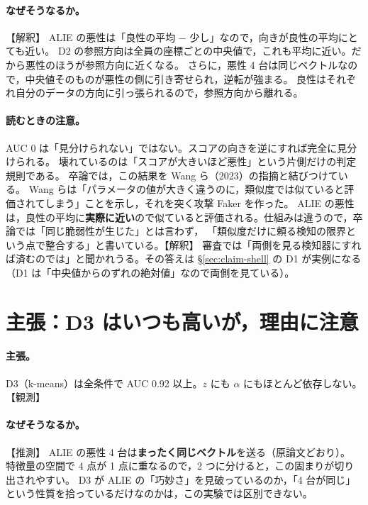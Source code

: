 \documentclass[a4j, dvipdfmx]{jsarticle}  %
\begin{document}
\paragraph{なぜそうなるか。}【解釈】
ALIE の悪性は「良性の平均 $-$ 少し」なので，向きが良性の平均にとても近い。
D2 の参照方向は全員の座標ごとの中央値で，これも平均に近い。だから悪性のほうが参照方向に近くなる。
さらに，悪性 4 台は同じベクトルなので，中央値そのものが悪性の側に引き寄せられ，逆転が強まる。
良性はそれぞれ自分のデータの方向に引っ張られるので，参照方向から離れる。

\paragraph{読むときの注意。}
AUC 0 は「見分けられない」ではない。スコアの向きを逆にすれば完全に見分けられる。
壊れているのは「スコアが大きいほど悪性」という片側だけの判定規則である。
卒論では，この結果を Wang ら（2023）の指摘と結びつけている。
Wang らは「パラメータの値が大きく違うのに，類似度では似ていると評価されてしまう」ことを示し，それを突く攻撃 Faker を作った。
ALIE の悪性は，良性の平均に\textbf{実際に近い}ので似ていると評価される。仕組みは違うので，卒論では「同じ脆弱性が生じた」とは言わず，
「類似度だけに頼る検知の限界という点で整合する」と書いている。【解釈】
審査では「両側を見る検知器にすれば済むのでは」と聞かれうる。その答えは \S\ref{sec:claim-shell} の D1 が実例になる（D1 は「中央値からのずれの絶対値」なので両側を見ている）。

\section{主張：D3 はいつも高いが，理由に注意}
\label{sec:claim-d3}

\paragraph{主張。}
D3（k-means）は全条件で AUC 0.92 以上。$z$ にも $\alpha$ にもほとんど依存しない。【観測】

\paragraph{なぜそうなるか。}【推測】
ALIE の悪性 4 台は\textbf{まったく同じベクトル}を送る（原論文どおり）。
特徴量の空間で 4 点が 1 点に重なるので，2 つに分けると，この固まりが切り出されやすい。
D3 が ALIE の「巧妙さ」を見破っているのか，「4 台が同じ」という性質を拾っているだけなのかは，この実験では区別できない。
\end{document}
